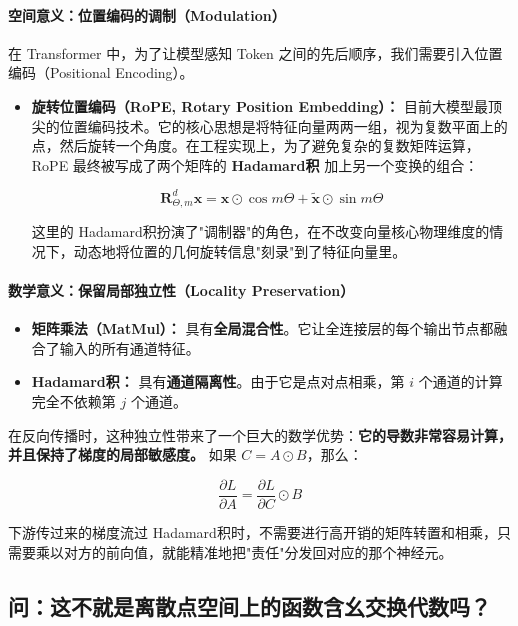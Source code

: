 \documentclass[10pt,a4paper]{article}
\begin{document}
\paragraph{空间意义：位置编码的调制（Modulation）}

在 Transformer 中，为了让模型感知 Token 之间的先后顺序，我们需要引入位置编码（Positional Encoding）。

\begin{itemize}
\item \textbf{旋转位置编码（RoPE, Rotary Position Embedding）\cite{Su2024RoPE}：}
目前大模型最顶尖的位置编码技术。它的核心思想是将特征向量两两一组，视为复数平面上的点，然后旋转一个角度。在工程实现上，为了避免复杂的复数矩阵运算，RoPE 最终被写成了两个矩阵的 \textbf{Hadamard积} 加上另一个变换的组合：

\[
\mathbf{R}_{\Theta, m}^d \mathbf{x} = \mathbf{x} \odot \cos m\Theta + \tilde{\mathbf{x}} \odot \sin m\Theta
\]

这里的 Hadamard积扮演了"调制器"的角色，在不改变向量核心物理维度的情况下，动态地将位置的几何旋转信息"刻录"到了特征向量里。
\end{itemize}

\paragraph{数学意义：保留局部独立性（Locality Preservation）}

\begin{itemize}
\item \textbf{矩阵乘法（MatMul）：} 具有\textbf{全局混合性}。它让全连接层的每个输出节点都融合了输入的所有通道特征。
\item \textbf{Hadamard积：} 具有\textbf{通道隔离性}。由于它是点对点相乘，第 $i$ 个通道的计算完全不依赖第 $j$ 个通道。
\end{itemize}

在反向传播时，这种独立性带来了一个巨大的数学优势：\textbf{它的导数非常容易计算，并且保持了梯度的局部敏感度。}
如果 $C = A \odot B$，那么：

\[
\frac{\partial L}{\partial A} = \frac{\partial L}{\partial C} \odot B
\]

下游传过来的梯度流过 Hadamard积时，不需要进行高开销的矩阵转置和相乘，只需要乘以对方的前向值，就能精准地把"责任"分发回对应的那个神经元。

\subsection{问：这不就是离散点空间上的函数含幺交换代数吗？}
\end{document}
